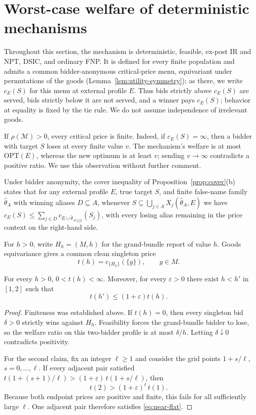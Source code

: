 \documentclass[format=acmsmall, review=false]{acmart}
\newcommand{\OPT}{\mathrm{OPT}}
\newcommand{\eps}{\varepsilon}
\theoremstyle{acmdefinition}%
\begin{document}
\section{Worst-case welfare of deterministic mechanisms}
\label{sec:deterministic}

Throughout this section, the mechanism is deterministic, feasible,
ex-post IR and NPT, DSIC, and ordinary FNP.  It is defined for
every finite population and admits a common bidder-anonymous critical-price
menu, equivariant under permutations of the goods
(Lemma~\ref{lem:utility-symmetry}); as there, we write $c_E(S)$ for this menu at
external profile $E$.  Thus bids strictly above $c_E(S)$ are served, bids
strictly below it are not served, and a winner pays $c_E(S)$; behavior
at equality is fixed by the tie rule.  We do not assume independence of
irrelevant goods.

If $\rho(\mathcal M)>0$, every critical price is finite.  Indeed, if
$c_E(S)=\infty$, then a bidder with target $S$ loses at every finite
value $v$.  The mechanism's welfare is at most $\OPT(E)$, whereas the new
optimum is at least $v$; sending $v\to\infty$ contradicts a positive ratio.
We use this observation without further comment.

Under bidder anonymity, the cover inequality of
Proposition~\ref{prop:cover}(b) states that for any external
profile $E$, true target $S$, and finite false-name family
$\hat\theta_A$ with winning aliases $D\subseteq A$, whenever
$S\subseteq\bigcup_{j\in A}X_j(\hat\theta_A,E)$ we have
$c_E(S)\le\sum_{j\in D}c_{E\cup\hat\theta_{A\setminus\{j\}}}(S_j)$,
with every losing alias remaining in the price context on the
right-hand side.

For $h>0$, write $H_h=(M,h)$ for the grand-bundle report of value $h$.
Goods equivariance gives a common clean singleton price
\[
  t(h)=c_{\{H_h\}}(\{g\}),
  \qquad g\in M.
\]

\begin{lemma}
\label{lem:no-iig-flat}
For every $h>0$, $0<t(h)<\infty$.  Moreover, for every $\eps>0$ there exist
$h<h'$ in $[1,2]$ such that
\begin{equation}
  t(h')\le(1+\eps)t(h).
  \label{eq:near-flat}
\end{equation}
\end{lemma}

\begin{proof}
Finiteness was established above.  If $t(h)=0$, then every singleton bid
$\delta>0$ strictly wins against $H_h$.  Feasibility forces the grand-bundle
bidder to lose, so the welfare ratio on this two-bidder profile is at most
$\delta/h$.  Letting $\delta\downarrow0$ contradicts positivity.

For the second claim, fix an integer $\ell\ge1$ and consider the grid
points $1+s/\ell$, $s=0,\ldots,\ell$.  If every adjacent pair satisfied
$t(1+(s+1)/\ell)>(1+\eps)\,t(1+s/\ell)$, then
\[
  t(2)>(1+\eps)^\ell\, t(1).
\]
Because both endpoint prices are positive and finite, this fails for all
sufficiently large $\ell$.  One adjacent pair therefore satisfies
\eqref{eq:near-flat}.
\end{proof}
\end{document}
